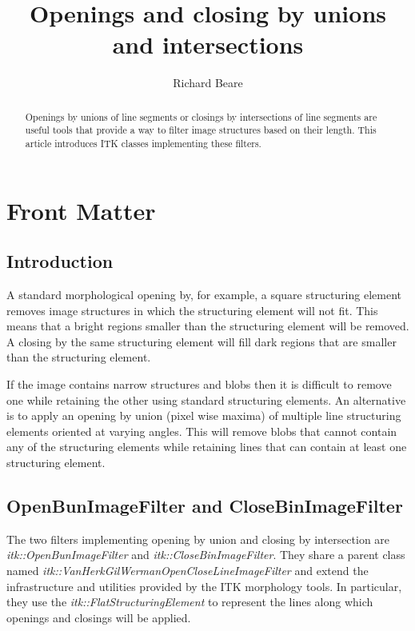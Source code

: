 \documentclass{InsightArticle}
\title{Openings and closing by unions and intersections}
\author{Richard Beare}
\newcommand{\IJhandlerIDnumber}{0000}
\begin{document}
\IJhandlefooter{\IJhandlerIDnumber}

\maketitle

\ifhtml
\chapter*{Front Matter\label{front}}
\fi


\begin{abstract}
\noindent
Openings by unions of line segments or closings by intersections of
line segments\cite{Serra82} are useful tools that provide a way to filter image
structures based on their length. This article introduces ITK classes
implementing these filters.
\end{abstract}

\tableofcontents

\section{Introduction}
A standard morphological opening by, for example, a square structuring
element removes image structures in which the structuring element will
not fit. This means that a bright regions smaller than the structuring
element will be removed. A closing by the same structuring element
will fill dark regions that are smaller than the structuring element.

If the image contains narrow structures and blobs then it is difficult
to remove one while retaining the other using standard structuring
elements. An alternative is to apply an opening by union (pixel wise
maxima) of multiple line structuring elements oriented at varying
angles. This will remove blobs that cannot contain any of the
structuring elements while retaining lines that can contain at least
one structuring element.

\section{OpenBunImageFilter and CloseBinImageFilter}
The two filters implementing opening by union and closing by
intersection are {\em itk::OpenBunImageFilter} and {\em
  itk::CloseBinImageFilter}. They share a parent class named {\em
  itk::VanHerkGilWermanOpenCloseLineImageFilter} and extend the
infrastructure and utilities provided by the ITK morphology tools. In
particular, they use the {\em itk::FlatStructuringElement} to
represent the lines along which openings and closings will be applied.
\end{document}

